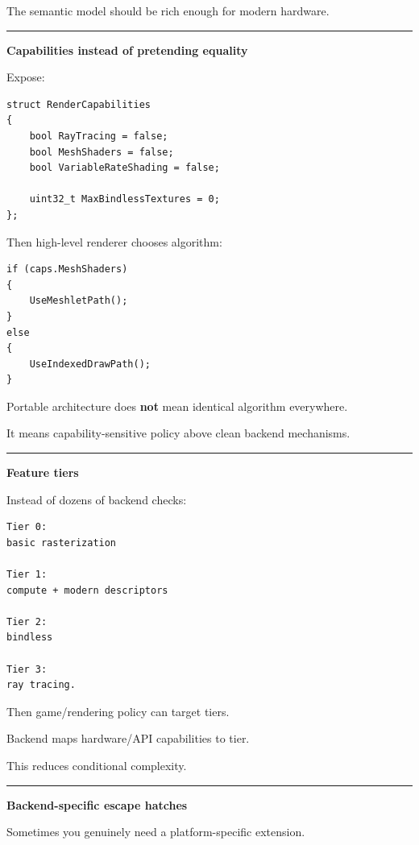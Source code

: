 The semantic model should be rich enough for modern hardware.

\begin{center}\rule{0.5\linewidth}{0.5pt}\end{center}

\textbf{Capabilities instead of pretending equality}

Expose:

\begin{verbatim}
struct RenderCapabilities
{
    bool RayTracing = false;
    bool MeshShaders = false;
    bool VariableRateShading = false;

    uint32_t MaxBindlessTextures = 0;
};
\end{verbatim}

Then high-level renderer chooses algorithm:

\begin{verbatim}
if (caps.MeshShaders)
{
    UseMeshletPath();
}
else
{
    UseIndexedDrawPath();
}
\end{verbatim}

Portable architecture does \textbf{not} mean identical algorithm everywhere.

It means capability-sensitive policy above clean backend mechanisms.

\begin{center}\rule{0.5\linewidth}{0.5pt}\end{center}

\textbf{Feature tiers}

Instead of dozens of backend checks:

\begin{verbatim}
Tier 0:
basic rasterization

Tier 1:
compute + modern descriptors

Tier 2:
bindless

Tier 3:
ray tracing.
\end{verbatim}

Then game/rendering policy can target tiers.

Backend maps hardware/API capabilities to tier.

This reduces conditional complexity.

\begin{center}\rule{0.5\linewidth}{0.5pt}\end{center}

\textbf{Backend-specific escape hatches}

Sometimes you genuinely need a platform-specific extension.

